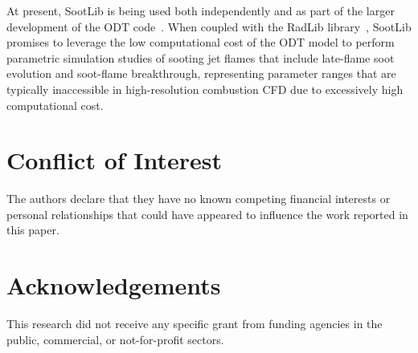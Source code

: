 \documentclass[preprint,letterpaper]{elsarticle}
\begin{document}
At present, SootLib is being used both independently and as part of the larger development of the ODT code~\cite{Stephens_2021}. When coupled with the RadLib library~\cite{Stephens_2022}, SootLib promises to leverage the low computational cost of the ODT model to perform parametric simulation studies of sooting jet flames that include late-flame soot evolution and soot-flame breakthrough, representing parameter ranges that are typically inaccessible in high-resolution combustion CFD due to excessively high computational cost.



\section{Conflict of Interest}


The authors declare that they have no known competing financial interests or personal relationships that could have appeared to influence the work reported in this paper.


\section*{Acknowledgements}

This research did not receive any specific grant from funding agencies in the public, commercial, or not-for-profit sectors.





%
%
\end{document}
